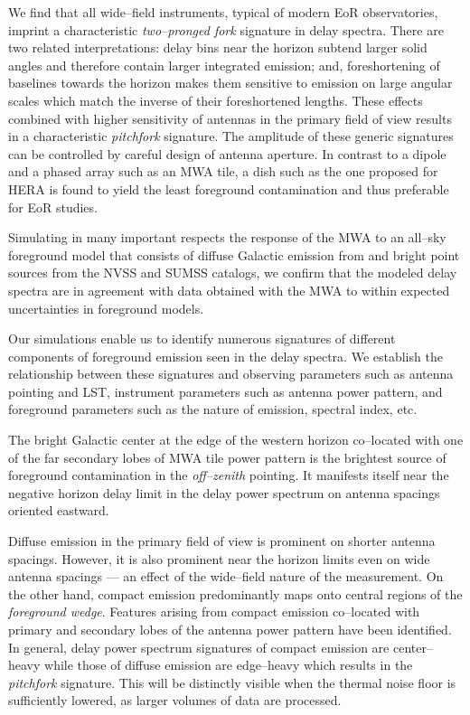 \documentclass[preprint2,iop,numberedappendix,twocolappendix,appendixfloats]{emulateapj}
\begin{document}
We find that all wide--field instruments, typical of modern EoR observatories, imprint a characteristic {\it two--pronged fork} signature in delay spectra. There are two related interpretations: delay bins near the horizon subtend larger solid angles and therefore contain larger integrated emission; and, foreshortening of baselines towards the horizon makes them sensitive to emission on large angular scales which match the inverse of their foreshortened lengths. These effects combined with higher sensitivity of antennas in the primary field of view results in a characteristic {\it pitchfork} signature. The amplitude of these generic signatures can be controlled by careful design of antenna aperture. In contrast to a dipole and a phased array such as an MWA tile, a dish such as the one proposed for HERA is found to yield the least foreground contamination and thus preferable for EoR studies.

Simulating in many important respects the response of the MWA to an all--sky foreground model that consists of diffuse Galactic emission from \citet{deo08} and bright point sources from the NVSS and SUMSS catalogs, we confirm that the modeled delay spectra are in agreement with data obtained with the MWA to within expected uncertainties in foreground models. 

Our simulations enable us to identify numerous signatures of different components of foreground emission seen in the delay spectra. We establish the relationship between these signatures and observing parameters such as antenna pointing and LST, instrument parameters such as antenna power pattern, and foreground parameters such as the nature of emission, spectral index, etc. 

The bright Galactic center at the edge of the western horizon co--located with one of the far secondary lobes of MWA tile power pattern is the brightest source of foreground contamination in the {\it off--zenith} pointing. It manifests itself near the negative horizon delay limit in the delay power spectrum on antenna spacings oriented eastward. 

Diffuse emission in the primary field of view is prominent on shorter antenna spacings. However, it is also prominent near the horizon limits even on wide antenna spacings --- an effect of the wide--field nature of the measurement. On the other hand, compact emission predominantly maps onto central regions of the {\it foreground wedge}. Features arising from compact emission co--located with primary and secondary lobes of the antenna power pattern have been identified. In general, delay power spectrum signatures of compact emission are center--heavy while those of diffuse emission are edge--heavy which results in the {\it pitchfork} signature. This will be distinctly visible when the thermal noise floor is sufficiently lowered, as larger volumes of data are processed. 
\end{document}
